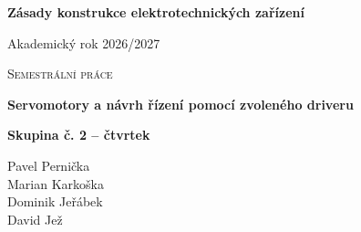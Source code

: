 
\begin{titlepage}
\thispagestyle{empty}
\centering
\color{black}

\vspace*{12mm}

{\large\bfseries
Zásady konstrukce elektrotechnických zařízení\par}

\vspace{4mm}
{\normalsize Akademický rok 2026/2027\par}

\vspace{48mm}

{\large\scshape Semestrální práce\par}

\vspace{5mm}

{\bfseries\fontsize{26}{33}\selectfont
Servomotory a návrh řízení pomocí zvoleného driveru\par}

\vfill

{\normalsize\bfseries
Skupina č. 2 -- čtvrtek\par}

\vspace{8mm}

{\large
Pavel Pernička\\[2mm]
Marian Karkoška\\[2mm]
Dominik Jeřábek\\[2mm]
David Jež\par}

\vspace*{5mm}

\end{titlepage}
